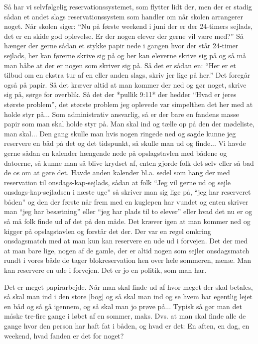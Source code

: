 Så har vi selvfølgelig reservationssystemet, som flytter lidt der, men der er stadig sådan et andet slags reservationssystem som handler om når skolen arrangerer noget. Når skolen siger: ``Nu på første weekend i juni der er der 24-timers sejlads, det er en skide god oplevelse. Er der nogen elever der gerne vil være med?'' Så hænger der gerne sådan et stykke papir nede i gangen hvor der står 24-timer sejlads, her kan førerne skrive sig på og her kan eleverne skrive sig på og så må man håbe at der er nogen som skriver sig på. Så det er sådan en: ``Her er et tilbud om en ekstra tur af en eller anden slags, skriv jer lige på her.'' Det foregår også på papir. Så det kræver altid at man kommer der ned og gør noget, skrive sig på, sørge for overblik. Så det der *pullik 9:11* der hedder ``Hvad er jeres største problem'', det største problem jeg oplevede var simpelthen det her med at holde styr på... Som administrativ ansvarlig, så er der bare en fandens masse papir som man skal holde styr på. Man skal ind og tælle op på den der mødeliste, man skal... Den gang skulle man hvis nogen ringede ned og sagde kunne jeg reservere en båd på det og det tidspunkt, så skulle man ud og finde... Vi havde gerne sådan en kalender hængende nede på opslagstavlen med bådene og datoerne, så kunne man så blive krydset af, enten gjorde folk det selv eller så bad de os om at gøre det. Havde anden kalender bl.a. sedel som hang der med reservation til onsdags-kap-sejlads, sådan at folk ``Jeg vil gerne ud og sejle onsdags-kap-sejladsen i næste uge'' så skriver man sig lige på, ``jeg har reserveret båden'' og den der første når frem med en kuglepen har vundet og enten skriver man ``jeg har besætning'' eller ``jeg har plads til to elever'' eller hvad det nu er og så må folk finde ud af det på den måde. Det kræver igen at man kommer ned og kigger på opslagstavlen og forstår det der. Der var en regel omkring onsdagsmatch med at man kun kan reservere en ude ud i forvejen. Det der med at man bare lige, nogen af de gamle, der er altid nogen som sejler onsdagsmatch rundt i vores både de tager blokreservation hen over hele sommeren, nænæ. Man kan reservere en ude i forvejen. Det er jo en politik, som man har. 

Det er meget papirarbejde. Når man skal finde ud af hvor meget der skal betales, så skal man ind i den store [bog] og så skal man ind og se hvem har egentlig lejet en båd og så gå igennem, og så skal man jo prøve på... Typisk så gør man det måske tre-fire gange i løbet af en sommer, maks. Dvs. at man skal finde alle de gange hvor den person har haft fat i båden, og hvad er det: En aften, en dag, en weekend, hvad fanden er det for noget? 

